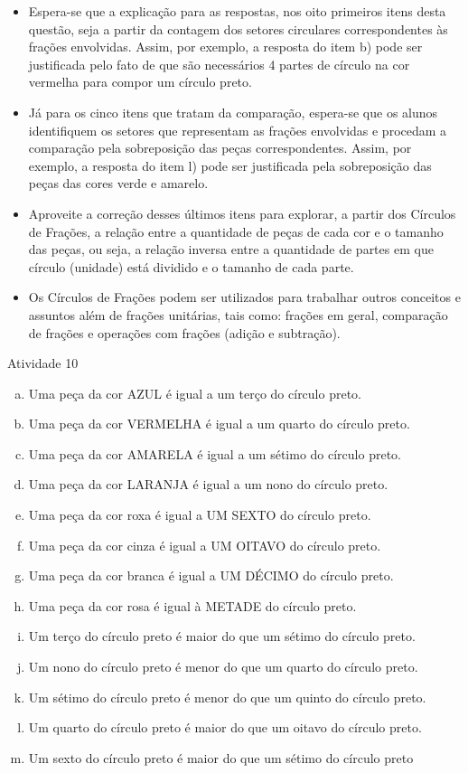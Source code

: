 \begin{multicols}{2}
\begin{itemize}
    \item Espera-se que a explicação para as respostas, nos oito primeiros itens desta questão, seja a partir da contagem dos setores circulares correspondentes às frações envolvidas. Assim, por exemplo, a resposta do item b) pode ser justificada pelo fato de que são necessários 4 partes de círculo na cor vermelha para compor um círculo preto.
    \item Já para os cinco itens que tratam da comparação, espera-se que os alunos identifiquem os setores que representam as frações envolvidas e procedam a comparação pela sobreposição das peças correspondentes. Assim, por exemplo, a resposta do item l) pode ser justificada pela sobreposição das peças das cores verde e amarelo.
    \item Aproveite a correção desses últimos itens para explorar, a partir dos Círculos de Frações, a relação entre a quantidade de peças de cada cor e o tamanho das peças, ou seja, a relação inversa entre a quantidade de partes em que círculo (unidade) está dividido e o tamanho de cada parte.
    \item Os Círculos de Frações podem ser utilizados para trabalhar outros conceitos e assuntos além de frações unitárias, tais como: frações em geral, comparação de frações e operações com frações (adição e subtração). 
    \end{itemize}
\end{multicols}

\begin{resposta*}{Atividade 10}
\begin{enumerate}[a)]
 \item Uma peça da cor AZUL é igual a um terço do círculo preto.
 \item    Uma peça da cor VERMELHA é igual a um quarto do círculo preto.
 \item    Uma peça da cor AMARELA é igual a um sétimo do círculo preto.
 \item    Uma peça da cor LARANJA é igual a um nono do círculo preto.
 \item    Uma peça da cor roxa é igual a UM SEXTO do círculo preto.
 \item    Uma peça da cor cinza é igual a UM OITAVO do círculo preto.
 \item    Uma peça da cor branca é igual a UM DÉCIMO do círculo preto.
 \item    Uma peça da cor rosa é igual à METADE do círculo preto.
 \item    Um terço do círculo preto é maior do que um sétimo do círculo preto.
 \item    Um nono do círculo preto é menor do que um quarto do círculo preto.
 \item    Um sétimo do círculo preto é menor do que um quinto do círculo preto.
 \item    Um quarto do círculo preto é maior do que um oitavo do círculo preto.
 \item    Um sexto do círculo preto é maior do que um sétimo do círculo preto
\end{enumerate}

\end{resposta*}

